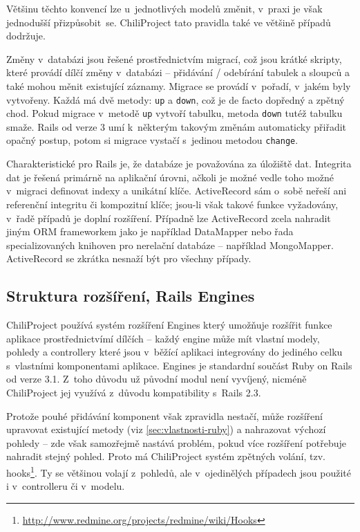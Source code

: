 \documentclass[thesis=B,czech]{FITthesis}[2012/05/02]
\begin{document}
Většinu těchto konvencí lze u~jednotlivých modelů změnit, v~praxi je
však jednodušší přizpůsobit~se. ChiliProject tato pravidla také ve
většině případů dodržuje.

Změny v~databázi jsou řešené prostřednictvím migrací, což jsou krátké
skripty, které provádí dílčí změny v~databázi -- přidávání / odebírání
tabulek a sloupců a také mohou měnit existující záznamy. Migrace se
provádí v~pořadí, v~jakém byly vytvořeny. Každá má dvě metody:
\lstinline!up! a \lstinline!down!, což je de facto dopředný a zpětný
chod. Pokud migrace v~metodě \lstinline!up! vytvoří tabulku, metoda
\lstinline!down! tutéž tabulku smaže. Rails od verze 3 umí k~některým
takovým změnám automaticky přiřadit opačný postup, potom si migrace
vystačí s~jedinou metodou \lstinline!change!.

Charakteristické pro Rails je, že databáze je považována za 
úložiště dat. Integrita dat je řešená primárně na aplikační úrovni,
ačkoli je možné vedle toho možné v~migraci definovat indexy a unikátní
klíče. ActiveRecord sám o~sobě neřeší ani referenční integritu či
kompozitní klíče; jsou-li však takové funkce vyžadovány, v~řadě případů
je doplní rozšíření. Případně lze ActiveRecord zcela nahradit jiným ORM
frameworkem jako je například DataMapper nebo řada specializovaných
knihoven pro nerelační databáze -- například MongoMapper. ActiveRecord
se zkrátka nesnaží být  pro všechny případy.

\subsection{Struktura rozšíření, Rails Engines}

ChiliProject používá systém rozšíření Engines který umožňuje rozšířit
funkce aplikace prostřednictvímí dílčích  -- každý
engine může mít vlastní modely, pohledy a controllery které jsou
v~běžící aplikaci integrovány do jediného celku s~vlastními komponentami
aplikace. Engines je standardní součást Ruby on Rails od verze 3.1.
Z~toho důvodu už původní modul není vyvíjený, nicméně ChiliProject jej
využívá z~důvodu kompatibility s~Rails 2.3.

Protože pouhé přidávání komponent však zpravidla nestačí, může rozšíření
upravovat existující metody (viz
\ref{sec:vlastnosti-ruby}) a
nahrazovat výchozí pohledy -- zde však samozřejmě nastává problém, pokud
více rozšíření potřebuje nahradit stejný pohled. Proto má ChiliProject
systém zpětných volání, tzv. hooks\footnote{\url{http://www.redmine.org/projects/redmine/wiki/Hooks}}.
Ty se většinou volají z~pohledů, ale v~ojedinělých případech jsou
použité i v~controlleru či v~modelu.
\end{document}
